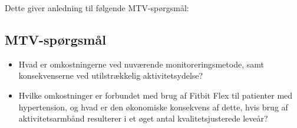 \noindent
Dette giver anledning til følgende MTV-spørgsmål: 

\subsection{MTV-spørgsmål}
 
\begin{itemize}
\item Hvad er omkostningerne ved nuværende monitoreringsmetode, samt konsekvenserne ved utilstrækkelig aktivitetsydelse? 
\item Hvilke omkostninger er forbundet med brug af Fitbit Flex til patienter med hypertension, og hvad er den økonomiske konsekvens af dette, hvis brug af aktivitetsarmbånd resulterer i et øget antal kvalitetsjusterede leveår?
\end{itemize}


